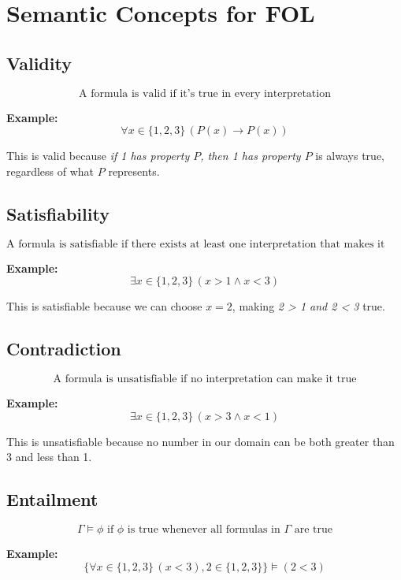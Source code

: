 \documentclass[12pt,a4paper,openany]{article}
\begin{document}

\section{Semantic Concepts for FOL}

\subsection{Validity}

$$\text{A formula is valid if it's true in every interpretation}$$

\textbf{Example:} 
$$\forall x \in \{1,2,3\} \, (P(x) \rightarrow P(x))$$

This is valid because \textit{if 1 has property $P$, then 1 has property $P$} is always true, regardless of what $P$ represents.

\subsection{Satisfiability}

$$\text{A formula is satisfiable if there exists at least one interpretation that makes it true}$$

\textbf{Example:} 
$$\exists x \in \{1,2,3\} \, (x > 1 \wedge x < 3)$$

This is satisfiable because we can choose $x = 2$, making \textit{2 > 1 and 2 < 3} true.

\subsection{Contradiction}

$$\text{A formula is unsatisfiable if no interpretation can make it true}$$

\textbf{Example:}
$$\exists x \in \{1,2,3\} \, (x > 3 \wedge x < 1)$$

This is unsatisfiable because no number in our domain can be both greater than 3 and less than 1.

\subsection{Entailment}

$$\Gamma \models \phi \text{ if } \phi \text{ is true whenever all formulas in } \Gamma \text{ are true}$$

\textbf{Example:} 
$$\{\forall x \in \{1,2,3\} \, (x < 3), 2 \in \{1,2,3\}\} \models (2 < 3)$$
\end{document}
